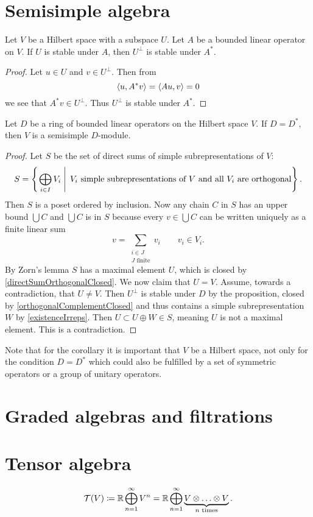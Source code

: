 \section{Semisimple algebra}
\begin{proposition}
Let $V$ be a Hilbert space with a subspace $U$. Let $A$ be a bounded linear operator on $V$. If $U$ is stable under $A$, then $U^\perp$ is stable under $A^*$.
\end{proposition}
\begin{proof}
Let $u\in U$ and $v\in U^\perp$. Then from
\[ \left\langle u, A^*v \right\rangle = \left\langle Au,v \right\rangle = 0 \]
we see that $A^*v \in U^\perp$. Thus $U^\perp$ is stable under $A^*$.
\end{proof}
\begin{corollary}
Let $D$ be a ring of bounded linear operators on the Hilbert space $V$. If $D=D^*$, then $V$ is a semisimple $D$-module.
\end{corollary}
\begin{proof}
Let $S$ be the set of direct sums of simple subrepresentations of $V$:
\[ S = \left\{\left. \bigoplus_{i\in I}V_i  \;\right|\; \text{$V_i$ simple subrepresentations of $V$ and all $V_i$ are orthogonal} \right\}. \]
Then $S$ is a poset ordered by inclusion. Now any chain $C$ in $S$ has an upper bound $\bigcup C$ and $\bigcup C$ is in $S$ because every $v\in\bigcup C$ can be written uniquely as a finite linear sum
\[ v = \sum_{\substack{i\in J\\ \text{$J$ finite}}} v_i \qquad v_i\in V_i. \]
By Zorn's lemma $S$ has a maximal element $U$, which is closed by \ref{directSumOrthogonalClosed}. We now claim that $U=V$. Assume, towards a contradiction, that $U\neq V$. Then $U^\perp$ is stable under $D$ by the proposition, closed by \ref{orthogonalComplementClosed} and thus contains a simple subrepresentation $W$ by \ref{existenceIrreps}. Then $U\subset U\oplus W \in S$, meaning $U$ is not a maximal element. This is a contradiction.
\end{proof}
Note that for the corollary it is important that $V$ be a Hilbert space, not only for the condition $D=D^*$ which could also be fulfilled by a set of symmetric operators or a group of unitary operators.


\section{Graded algebras and filtrations}

\section{Tensor algebra}
\[ \mathcal{T}(V) \coloneqq \mathbb{R} \bigoplus_{n=1}^\infty V^n = \mathbb{R} \bigoplus_{n=1}^\infty \underbrace{V\otimes \ldots \otimes V}_{\text{$n$ times}}. \]

